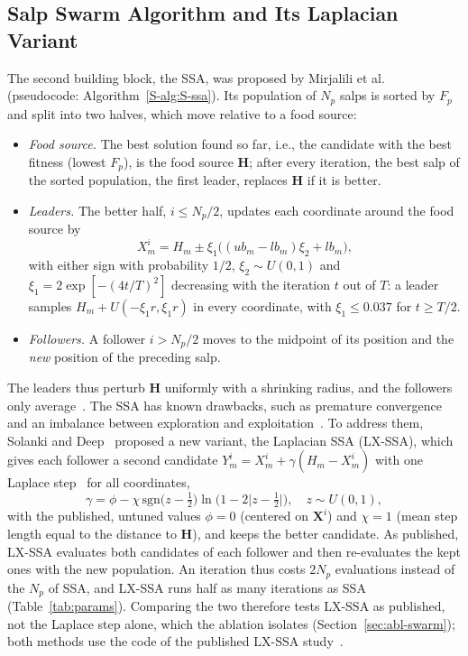 \subsection{Salp Swarm Algorithm and Its Laplacian Variant}
\label{sec:ssa}
\label{sec:S-ssa}
The second building block, the SSA, was proposed by Mirjalili et al.~\cite{Mirjalili2017} (pseudocode: Algorithm~\ref{S-alg:S-ssa}). Its population of $N_p$ salps is sorted by $F_p$ and split into two halves, which move relative to a food source:
\begin{itemize}
\item \emph{Food source.} The best solution found so far, i.e., the candidate with the best fitness (lowest $F_p$), is the food source $\mathbf H$; after every iteration, the best salp of the sorted population, the first leader, replaces $\mathbf H$ if it is better.
\item \emph{Leaders.} The better half, $i\le N_p/2$, updates each coordinate around the food source by
\begin{equation}\label{eq:leader}
X_m^i = H_m\pm\xi_1\big((ub_m-lb_m)\xi_2+lb_m\big),
\end{equation}
with either sign with probability $1/2$, $\xi_2\sim U(0,1)$ and $\xi_1=2\exp[-(4t/T)^2]$ decreasing with the iteration $t$ out of $T$: a leader samples $H_m+U(-\xi_1r,\xi_1r)$ in every coordinate, with $\xi_1\le0.037$ for $t\ge T/2$.
\item \emph{Followers.} A follower $i>N_p/2$ moves to the midpoint of its position and the \emph{new} position of the preceding salp.
\end{itemize}
The leaders thus perturb $\mathbf H$ uniformly with a shrinking radius, and the followers only average~\cite{Castelli2022}. The SSA has known drawbacks, such as premature convergence and an imbalance between exploration and exploitation~\cite{Castelli2022,Solanki2023}. To address them, Solanki and Deep~\cite{Solanki2023} proposed a new variant, the Laplacian SSA (LX-SSA), which gives each follower a second candidate $Y_m^i=X_m^i+\gamma(H_m-X_m^i)$ with one Laplace step~\cite{Deep2007} for all coordinates,
\begin{equation}
\gamma=\phi-\chi\,\mathrm{sgn}\bigl(z-\tfrac12\bigr)\ln\bigl(1-2\lvert z-\tfrac12\rvert\bigr),\quad z\sim U(0,1),
\label{eq:laplace}
\end{equation}
with the published, untuned values $\phi=0$ (centered on $\mathbf X^i$) and $\chi=1$ (mean step length equal to the distance to $\mathbf H$), and keeps the better candidate. As published, LX-SSA evaluates both candidates of each follower and then re-evaluates the kept ones with the new population. An iteration thus costs $2N_p$ evaluations instead of the $N_p$ of SSA, and LX-SSA runs half as many iterations as SSA (Table~\ref{tab:params}). Comparing the two therefore tests LX-SSA as published, not the Laplace step alone, which the ablation isolates (Section~\ref{sec:abl-swarm}); both methods use the code of the published LX-SSA study~\cite{Solanki2023}.
